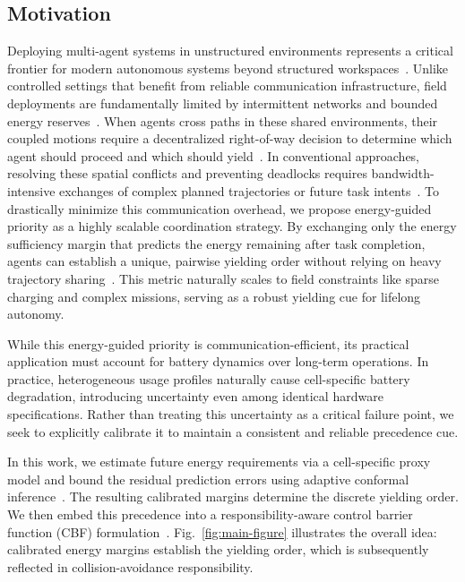 \subsection{Motivation}
Deploying multi-agent systems in unstructured environments represents a critical frontier for modern autonomous systems beyond structured workspaces~\cite{yoshitake2019new, krnjaic2024scalable}.
Unlike controlled settings that benefit from reliable communication infrastructure, field deployments are fundamentally limited by intermittent networks and bounded energy reserves~\cite{mathew2015multirobot, calvo2025heterogeneous}.
When agents cross paths in these shared environments, their coupled motions require a decentralized right-of-way decision to determine which agent should proceed and which should yield~\cite{thomas2019right, celi2019deconfliction}.
In conventional approaches, resolving these spatial conflicts and preventing deadlocks requires bandwidth-intensive exchanges of complex planned trajectories or future task intents~\cite{wu2025decentralized, grover2023before}.
To drastically minimize this communication overhead, we propose energy-guided priority as a highly scalable coordination strategy. 
By exchanging only the energy sufficiency margin that predicts the energy remaining after task completion, agents can establish a unique, pairwise yielding order without relying on heavy trajectory sharing~\cite{notomista2018persistification, notomista2020persistification}.
This metric naturally scales to field constraints like sparse charging and complex missions, serving as a robust yielding cue for lifelong autonomy.

While this energy-guided priority is communication-efficient, its practical application must account for battery dynamics over long-term operations.
In practice, heterogeneous usage profiles naturally cause cell-specific battery degradation, introducing uncertainty even among identical hardware specifications. 
Rather than treating this uncertainty as a critical failure point, we seek to explicitly calibrate it to maintain a consistent and reliable precedence cue.

In this work, we estimate future energy requirements via a cell-specific proxy model and bound the residual prediction errors using adaptive conformal inference~\cite{gibbs2021adaptive}.
The resulting calibrated margins determine the discrete yielding order.
We then embed this precedence into a responsibility-aware control barrier function (CBF) formulation~\cite{cosner2023learning}.
Fig.~\ref{fig:main-figure} illustrates the overall idea: calibrated energy margins establish the yielding order, which is subsequently reflected in collision-avoidance responsibility.

